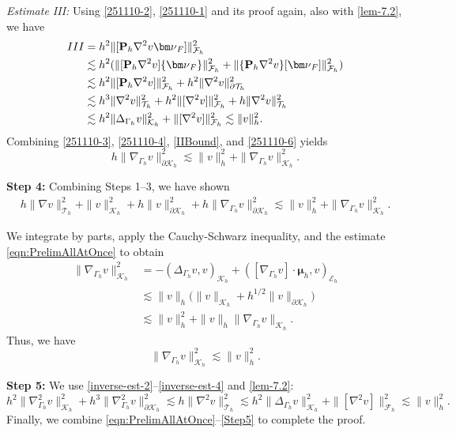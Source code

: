 \documentclass[10pt, a4paper]{amsart}
\newcommand{\p}{\partial}
\newcommand{\nab}{\nabla}
\newcommand{\bmu}{{\bm \mu}}
\newcommand{\calT}{\mathcal{T}}
\newcommand{\calE}{\mathcal{E}}
\newcommand{\calF}{\mathcal{F}}
\newcommand{\calK}{\mathcal{K}}
\newcommand{\bnu}{{\bm \nu}}
\theoremstyle{definition}
\theoremstyle{remark}
\theoremstyle{example}
\numberwithin{equation}{section}
\begin{document}
\textit{Estimate III:} Using \eqref{251110-2}, \eqref{251110-1} and its proof again, also with \eqref{lem-7.2}, we have
\begin{align}
\begin{split} \label{251110-6}
III
& = h^2\|[{\bf P}_h\nab^2v\bnu_F]\|_{\calF_h}^2 \\
& \lesssim h^2(\|[{\bf P}_h\nab^2v]\{\bnu_F\}\|_{\calF_h}^2 + \|\{{\bf P}_h\nab^2v\}[\bnu_F]\|_{\calF_h}^2) \\
& \lesssim h^2\|[{\bf P}_h\nab^2v]\|_{\calF_h}^2 + h^2\|\nab^2v\|_{\p\calT_h}^2 \\
& \lesssim h^3\|\nab^2v\|_{\calT_h}^2 + h^2\|[\nab^2v]\|_{\calF_h}^2 + h\|\nab^2v\|_{\calT_h}^2 \\
& \lesssim h^2\|\Delta_{\Gamma_h}v\|_{\calK_h}^2 + \|[\nab^2v]\|_{\calF_h}^2\lesssim \|v\|_h^2.
\end{split}
\end{align}
Combining \eqref{251110-3}, \eqref{251110-4}, \eqref{IIBound}, and \eqref{251110-6} yields
\begin{equation}
\label{Step3}
h \|\nab_{\Gamma_h} v\|_{\p \calK_h}^2\lesssim \|v\|_h^2 + \|\nab_{\Gamma_h} v\|_{\calK_h}^2.
\end{equation}

{\bf Step 4:}
Combining Steps 1--3, we have shown
\begin{align}\label{eqn:PrelimAllAtOnce}
h\|\nab v\|_{\calT_h}^2+ \|v\|_{\calK_h}^2 +h \|v\|_{\p \calK_h}^2 
+ h \|\nab_{\Gamma_h} v\|_{\p \calK_h}^2 \lesssim \|v\|_h^2 + \|\nab_{\Gamma_h} v\|_{\calK_h}^2.
\end{align}

We integrate by parts, apply the Cauchy-Schwarz inequality, and
the estimate \eqref{eqn:PrelimAllAtOnce} to obtain
\begin{align*}
\|\nab_{\Gamma_h} v\|_{\calK_h}^2  
&= -(\Delta_{\Gamma_h} v,v)_{\calK_h}+([\nab_{\Gamma_h} v]\cdot \bmu_h,v)_{\calE_h}\\
%
&\lesssim  \|v\|_h \big( \|v\|_{\calK_h} + h^{1/2}\|v\|_{\p \calK_h}\big)\\
&\lesssim  \|v\|_h^2+ \|v\|_h \|\nab_{\Gamma_h} v\|_{\calK_h}.
\end{align*}
Thus, we have 
\begin{equation}\label{Step4}
\|\nab_{\Gamma_h} v\|_{\calK_h}^2  \lesssim \|v\|_h^2.
\end{equation}

{\bf Step 5:}
We use \eqref{inverse-est-2}--\eqref{inverse-est-4} and \eqref{lem-7.2}:
%
\begin{equation}\label{Step5}
h^2\|\nab_{\Gamma_h}^2v\|_{\calK_h}^2 + h^3\|\nab_{\Gamma_h}^2v\|_{\p\calK_h}^2
\lesssim h\|\nab^2v\|_{\calT_h}^2
\lesssim h^2\|\Delta_{\Gamma_h}v\|_{\calK_h}^2 + \|[\nab^2v]\|_{\calF_h}^2
\lesssim \|v\|_h^2.
\end{equation}
Finally, we combine \eqref{eqn:PrelimAllAtOnce}--\eqref{Step5} to complete the proof.
\end{document}
